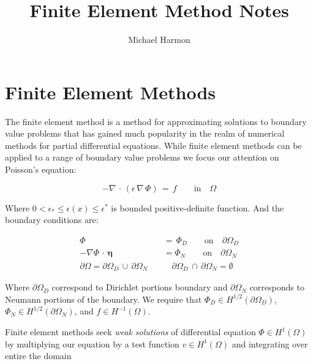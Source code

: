 \documentclass[10pt]{report}
\title{Finite Element Method Notes}
\author{Michael Harmon}
\numberwithin{equation}{section}
\begin{document}
\maketitle

\tableofcontents

\chapter{Finite Element Methods}


\noindent
The finite element method is a method for approximating solutions to
boundary value problems that has gained much popularity in the realm of 
numerical methods for partial differential equations.  While finite element methods can be applied to a range of boundary value problems we focus our attention on Poisson's equation:

\begin{equation}\label{eq:Poisson}
-\nabla \, \cdot \, \left(\epsilon \, \nabla \, \Phi \right) \, = \, f \qquad \text{in} \quad \Omega
\end{equation}


\noindent
Where $ 0 < \epsilon_{*} 
\leq \epsilon(x)  \leq \epsilon^{*} $ is bounded positive-definite function. And the boundary conditions are:


\begin{align}
\Phi \, &= \, \Phi_{D} \qquad \text{on} \quad \partial \Omega_{D} \label{eq:DirichletBC} \\
-\nabla \Phi \, \cdot \, \boldsymbol \eta  &= \Phi_{N} \qquad \text{on} \quad \partial \Omega_{N} \label{eq:NeumannBC} \\
 \partial \Omega = \partial \Omega_{D} \, \cup \, \partial \Omega_{N} \quad & \quad \partial \Omega_{D} \, \cap \, \partial \Omega_{N} = \emptyset
\end{align}


\noindent
Where $\partial \Omega_{D}$ correspond to Dirichlet portions boundary and $\partial \Omega_{N}$ corresponds to Neumann portions of the boundary.  We require that $\Phi_{D} \in H^{1/2}(\partial \Omega_{D})$, $\Phi_{N} \in H^{1/2}(\partial \Omega_{N})$, and $f \in H^{-1}(\Omega)$.
 


\vspace{2mm}


\noindent
Finite element methods seek \textit{weak solutions} of differential equation $\Phi \in H^{1}(\Omega)$ by multiplying our equation by a test function $v \in H^{1}(\Omega)$ and integrating over entire the domain
\end{document}

